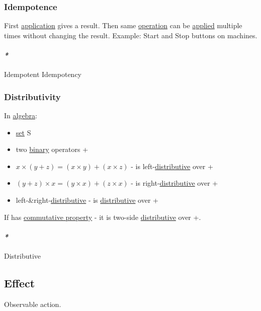 \documentclass[a4paper,14pt,oneside]{book}
\begin{document}
\subsubsection{\label{orge1e2d58}Idempotence}
\label{sec:org21d8270}
First \hyperref[orgbc2050d]{application} gives a result. Then same \hyperref[org9f0320f]{operation} can be \hyperref[org1614aad]{applied} multiple times without changing the result.
Example: Start and Stop buttons on machines.

\paragraph{\emph{*}}
\label{sec:org40e88bb}

\label{org85afd7f}Idempotent
\label{org6aaa0db}Idempotency

\subsubsection{\label{org0683038}Distributivity}
\label{sec:org36a2dfc}
In \hyperref[org375d0d8]{algebra}:
\begin{itemize}
\item \hyperref[orge965c76]{set} S
\item two \hyperref[org8c3a5b6]{binary} operators + \texttimes{}

\item \(x \times (y + z) = (x \times y) + (x \times z)\) - \texttimes{} is left-\hyperref[org602c600]{distributive} over +
\item \((y + z) \times x = (y \times x) + (z \times x)\) - \texttimes{} is right-\hyperref[org602c600]{distributive} over +
\item left-\&right-\hyperref[org602c600]{distributive} - \texttimes{} is \hyperref[org602c600]{distributive} over +
\end{itemize}

If \texttimes{} has \hyperref[org5dde5fc]{commutative property} - it is two-side \hyperref[org602c600]{distributive} over +.

\paragraph{\emph{*}}
\label{sec:orgda7750a}

\label{org602c600}Distributive

\subsection{\label{org6554ba3}Effect}
\label{sec:orgf5f9725}
Observable action.
\end{document}
